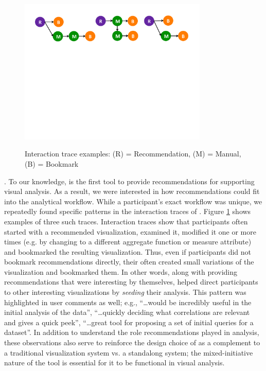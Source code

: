 \begin{figure}
	\centering
	{\includegraphics[trim={0 0 0 0}, clip, width=9cm]{Images/traces.pdf}}
	\caption{Interaction trace examples: (R) = Recommendation, (M) = Manual, (B) = Bookmark}
	\vspace{-10pt}
	\label{fig:traces}
\end{figure}

. 
To our knowledge, \SeeDB is the first tool to provide recommendations for supporting visual
analysis.
As a result, we were interested in how recommendations could fit into the analytical workflow.
While a participant's exact workflow was unique, we repeatedly found specific patterns in the
interaction traces of \SeeDB.
Figure \ref{fig:traces} shows examples of three such traces.
Interaction traces show that participants often started with a recommended visualization, 
examined it, modified it one or more times (e.g. by changing to a different aggregate function 
or measure attribute) and bookmarked the resulting visualization.
Thus, even if participants did not bookmark recommendations directly, their often created
small variations of the visualization and bookmarked them.
In other words, along with providing recommendations that were interesting by themselves, \SeeDB
helped direct participants to other interesting visualizations by {\em seeding} their analysis.
This pattern was highlighted in user comments as well; e.g.,
``\ldots would be incredibly useful in the initial analysis of the data'', 
``\ldots quickly deciding what correlations are relevant and gives a quick peek'',
``\ldots great tool for proposing a set of initial queries for a dataset''.
In addition to understand the role recommendations played in analysis, these observations 
also serve to reinforce the design choice of \SeeDB as a complement to a traditional
visualization system vs. a standalong system; the mixed-initiative nature of the tool 
is essential for it to be functional in visual analysis.

